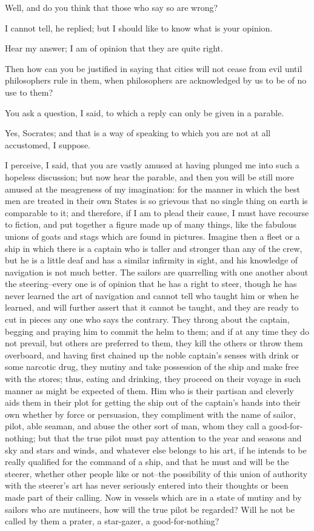 Well, and do you think that those who say so are wrong?

I cannot tell, he replied; but I should like to know what is your
opinion.

Hear my answer; I am of opinion that they are quite right.

Then how can you be justified in saying that cities will not cease from
evil until philosophers rule in them, when philosophers are acknowledged
by us to be of no use to them?

You ask a question, I said, to which a reply can only be given in a
parable.

Yes, Socrates; and that is a way of speaking to which you are not at all
accustomed, I suppose.

I perceive, I said, that you are vastly amused at having plunged me into
such a hopeless discussion; but now hear the parable, and then you will
be still more amused at the meagreness of my imagination: for the manner
in which the best men are treated in their own States is so grievous
that no single thing on earth is comparable to it; and therefore, if
I am to plead their cause, I must have recourse to fiction, and put
together a figure made up of many things, like the fabulous unions of
goats and stags which are found in pictures. Imagine then a fleet or a
ship in which there is a captain who is taller and stronger than any of
the crew, but he is a little deaf and has a similar infirmity in sight,
and his knowledge of navigation is not much better. The sailors are
quarrelling with one another about the steering--every one is of opinion
that he has a right to steer, though he has never learned the art of
navigation and cannot tell who taught him or when he learned, and will
further assert that it cannot be taught, and they are ready to cut in
pieces any one who says the contrary. They throng about the captain,
begging and praying him to commit the helm to them; and if at any time
they do not prevail, but others are preferred to them, they kill the
others or throw them overboard, and having first chained up the noble
captain's senses with drink or some narcotic drug, they mutiny and take
possession of the ship and make free with the stores; thus, eating
and drinking, they proceed on their voyage in such manner as might be
expected of them. Him who is their partisan and cleverly aids them in
their plot for getting the ship out of the captain's hands into their
own whether by force or persuasion, they compliment with the name of
sailor, pilot, able seaman, and abuse the other sort of man, whom they
call a good-for-nothing; but that the true pilot must pay attention
to the year and seasons and sky and stars and winds, and whatever else
belongs to his art, if he intends to be really qualified for the command
of a ship, and that he must and will be the steerer, whether other
people like or not--the possibility of this union of authority with the
steerer's art has never seriously entered into their thoughts or been
made part of their calling. Now in vessels which are in a state of
mutiny and by sailors who are mutineers, how will the true pilot be
regarded? Will he not be called by them a prater, a star-gazer, a
good-for-nothing?

